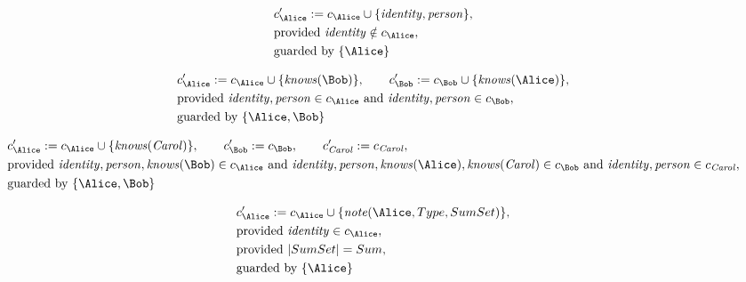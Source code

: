 \begin{align*}
&
c'_
{
\Alice
}
 := 
c_
{
\Alice
}
 \cup 
\{
\mathit{\detokenize{
identity
}}
,
\mathit{\detokenize{
person
}}
\}
,\\
&
\text{provided } 
\mathit{\detokenize{
identity
}}
 \notin c_
{
\Alice
}
,\\
&
\text{guarded by } \{
\Alice
\}
\end{align*}

\begin{align*}
&
c'_
{
\Alice
}
 := 
c_
{
\Alice
}
 \cup 
\{
\mathit{\detokenize{
knows
}}
(
\Bob
)
\}
, \qquad 
c'_
{
\Bob
}
 := 
c_
{
\Bob
}
 \cup 
\{
\mathit{\detokenize{
knows
}}
(
\Alice
)
\}
,\\
&
\text{provided } 
\mathit{\detokenize{
identity
}}
,
\mathit{\detokenize{
person
}}
 \in c_
{
\Alice
}
 \text{ and } 
\mathit{\detokenize{
identity
}}
,
\mathit{\detokenize{
person
}}
 \in c_
{
\Bob
}
,\\
&
\text{guarded by } \{
\Alice
,
\Bob
\}
\end{align*}

\begin{align*}
&
c'_
{
\Alice
}
 := 
c_
{
\Alice
}
 \cup 
\{
\mathit{\detokenize{
knows
}}
(
\mathit{Carol}
)
\}
, \qquad 
c'_
{
\Bob
}
 := 
c_
{
\Bob
}
, \qquad 
c'_
{
\mathit{Carol}
}
 := 
c_
{
\mathit{Carol}
}
,\\
&
\text{provided } 
\mathit{\detokenize{
identity
}}
,
\mathit{\detokenize{
person
}}
,
\mathit{\detokenize{
knows
}}
(
\Bob
)
 \in c_
{
\Alice
}
 \text{ and } 
\mathit{\detokenize{
identity
}}
,
\mathit{\detokenize{
person
}}
,
\mathit{\detokenize{
knows
}}
(
\Alice
)
,
\mathit{\detokenize{
knows
}}
(
\mathit{Carol}
)
 \in c_
{
\Bob
}
 \text{ and } 
\mathit{\detokenize{
identity
}}
,
\mathit{\detokenize{
person
}}
 \in c_
{
\mathit{Carol}
}
,\\
&
\text{guarded by } \{
\Alice
,
\Bob
\}
\end{align*}

\begin{align*}
&
c'_
{
\Alice
}
 := 
c_
{
\Alice
}
 \cup 
\{
\mathit{\detokenize{
note
}}
(
\Alice
,
Type
,
SumSet
)
\}
,\\
&
\text{provided } 
\mathit{\detokenize{
identity
}}
 \in c_
{
\Alice
}
,\\
&
\text{provided } 
|
SumSet
|
=
Sum
,\\
&
\text{guarded by } \{
\Alice
\}
\end{align*}


